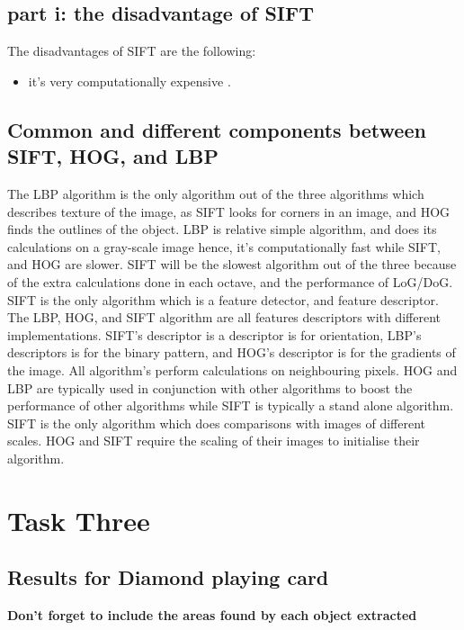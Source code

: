 \documentclass[conference]{IEEEtran}
\begin{document}
\subsection{part i: the disadvantage of SIFT}
The disadvantages of SIFT are the following:
\begin{itemize}
	\item it's very computationally expensive \cite{b8}.
\end{itemize}
\subsection{Common  and different components between SIFT, HOG, and LBP}

The LBP algorithm is the only algorithm out of the three algorithms which describes texture of the image, as SIFT looks for corners in an image, and HOG finds the outlines of  the object. LBP is relative simple algorithm, and does its calculations on a gray-scale image hence, it's computationally fast while SIFT, and HOG are slower. SIFT will be the slowest algorithm out of the three because of the extra calculations done in each octave, and the performance of LoG/DoG. SIFT is the only algorithm which is a feature detector, and feature descriptor. The LBP, HOG, and SIFT algorithm are all features descriptors with different implementations. SIFT's descriptor is a descriptor is for orientation, LBP's descriptors is for the binary pattern, and HOG's descriptor is for the gradients of the image. All algorithm's perform calculations on neighbouring pixels. HOG and LBP are typically used in conjunction with other algorithms to boost the performance of other algorithms while SIFT is typically a stand alone algorithm. SIFT is the only algorithm which does comparisons with images of different scales. HOG and SIFT require the scaling of their images to initialise their algorithm.\par

\section{Task Three} \label{three}

\subsection{Results for Diamond playing card}

\textbf{Don't forget to include the areas found by each object extracted}
\end{document}
